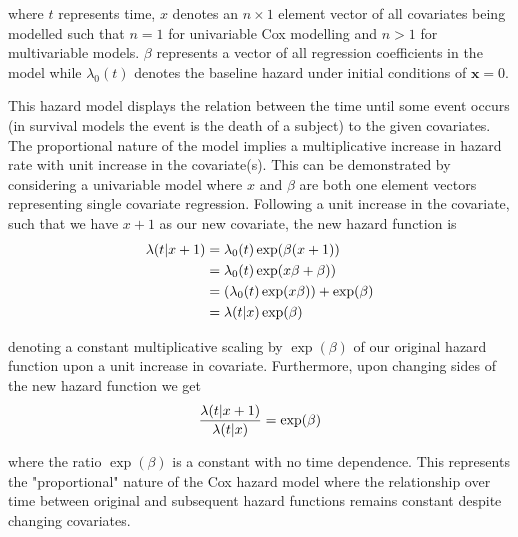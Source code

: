 \documentclass{l4proj}
\begin{document}
where \(t\) represents time, \textbf{\(x\)} denotes an \(n \times 1\) element vector of all covariates being modelled such that \(n=1\) for univariable Cox modelling and \(n > 1\) for multivariable models. \(\beta\) represents a vector of all regression coefficients in the model while \(\lambda_0 (t)\) denotes the baseline hazard under initial conditions of \(\textbf{x} = 0\). 

This hazard model displays the relation between the time until some event occurs (in survival models the event is the death of a subject) to the given covariates. The proportional nature of the model implies a multiplicative increase in hazard rate with unit increase in the covariate(s). This can be demonstrated by considering a univariable model where \(x\) and \(\beta\) are both one element vectors representing single covariate regression. Following a unit increase in the covariate, such that we have \(x + 1\) as our new covariate, the new hazard function is
\begin{equation}
    \centering
    \begin{aligned}
        \lambda (t | x + 1) ={}& \lambda_0 (t) \exp (\beta (x+1)) \\
                            ={}& \lambda_0 (t) \exp (x\beta  + \beta)) \\
                            ={}& (\lambda_0 (t) \exp (x\beta)) + \exp (\beta) \\
                            ={}& \lambda (t | x ) \exp (\beta)
    \end{aligned}
\end{equation}

denoting a constant multiplicative scaling by \(\exp (\beta)\) of our original hazard function upon a unit increase in covariate. Furthermore, upon changing sides of the new hazard function we get
\begin{equation}
    \centering
    \begin{aligned}
        \frac{\lambda (t | x + 1)}{\lambda (t | x )} = \exp (\beta) 
    \end{aligned}
\end{equation}

where the ratio \(\exp (\beta)\) is a constant with no time dependence. This represents the "proportional" nature of the Cox hazard model where the relationship over time between original and subsequent hazard functions remains constant despite changing covariates. 
\end{document}
